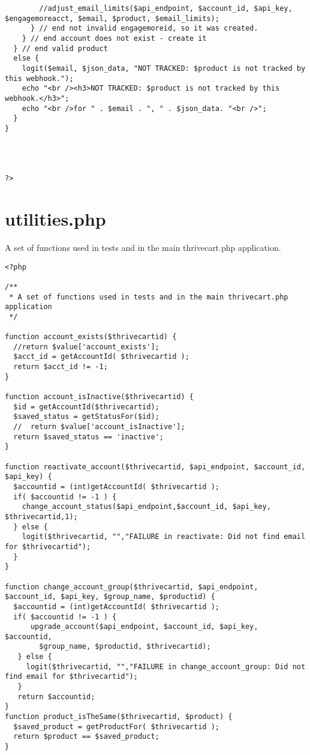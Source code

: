 \documentclass[final,letterpaper,12pt]{article}
\begin{document}
\begin{appendices}
\begin{verbatim}
        //adjust_email_limits($api_endpoint, $account_id, $api_key, $engagemoreacct, $email, $product, $email_limits);
      } // end not invalid engagemoreid, so it was created.
    } // end account does not exist - create it
  } // end valid product
  else {
    logit($email, $json_data, "NOT TRACKED: $product is not tracked by this webhook.");
    echo "<br /><h3>NOT TRACKED: $product is not tracked by this webhook.</h3>";
    echo "<br />for " . $email . ", " . $json_data. "<br />";
  }
}




?>
\end{verbatim}
\section{utilities.php}
\noindent A set of functions used in tests and in the main thrivecart.php application.
\begin{verbatim}
<?php

/**
 * A set of functions used in tests and in the main thrivecart.php application
 */

function account_exists($thrivecartid) {
  //return $value['account_exists'];
  $acct_id = getAccountId( $thrivecartid );
  return $acct_id != -1;
}

function account_isInactive($thrivecartid) {
  $id = getAccountId($thrivecartid);
  $saved_status = getStatusFor($id);
  //  return $value['account_isInactive'];
  return $saved_status == 'inactive';
}

function reactivate_account($thrivecartid, $api_endpoint, $account_id, $api_key) {
  $accountid = (int)getAccountId( $thrivecartid );
  if( $accountid != -1 ) {
    change_account_status($api_endpoint,$account_id, $api_key, $thrivecartid,1);
  } else {
    logit($thrivecartid, "","FAILURE in reactivate: Did not find email for $thrivecartid");
  }
}

function change_account_group($thrivecartid, $api_endpoint, $account_id, $api_key, $group_name, $productid) {
  $accountid = (int)getAccountId( $thrivecartid );
  if( $accountid != -1 ) {
      upgrade_account($api_endpoint, $account_id, $api_key, $accountid,
        $group_name, $productid, $thrivecartid);
   } else {
     logit($thrivecartid, "","FAILURE in change_account_group: Did not find email for $thrivecartid");
   }
   return $accountid;
}
function product_isTheSame($thrivecartid, $product) {
  $saved_product = getProductFor( $thrivecartid );
  return $product == $saved_product;
}


\end{verbatim}
\end{appendices}
\end{document}
